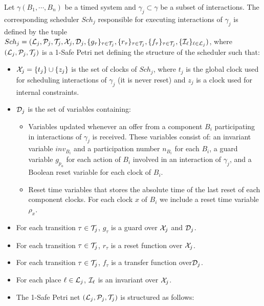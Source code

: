 \begin{definition}[Scheduler]\label{def:sch_sr}
  Let $\gamma(B_1,\cdots,B_n)$ be a timed system and $\gamma_j\subset\gamma$ be a subset of
  interactions. The corresponding scheduler $Sch_j$ responsible for executing interactions
  of $\gamma_j$ is defined by the tuple  
  $Sch_j=(\mathcal{L}_j, \mathcal{P}_j,\mathcal{T}_j,\mathcal{X}_j, \mathcal{D}_j,\{g_{\tau}\}_{\tau\in\mathcal{T}_j},
  \{r_{\tau}\}_{\tau\in\mathcal{T}_j},\{f_{\tau}\}_{\tau\in\mathcal{T}_j},\{\mathcal{I}_{\ell}\}_{\ell\in\mathcal{L}_j})
  $, where $(\mathcal{L}_j,\mathcal{P}_j,\mathcal{T}_j)$ is a 1-Safe Petri net defining 
      the structure of the scheduler such that:
  \begin{itemize}
    \item $\mathcal{X}_j=\{t_j\}\cup\{z_j\}$ is the set of clocks of $Sch_j$, where $t_j$ is
      the global clock used for scheduling interactions of $\gamma_j$ (it is never reset)
      and $z_j$ is a clock used for internal constraints. 
    \item $\mathcal{D}_j$ is the set of variables containing:
      \begin{itemize}
        \item Variables updated whenever an offer from a component $B_i$ participating in 
          interactions of $\gamma_j$ is received. These variables consist of: an invariant
          variable $inv_{B_i}$ and a participation number $n_{B_i}$ for each $B_i$, 
          a guard variable $g_{p_a}$ for each action of $B_i$ involved in an interaction of 
          $\gamma_j$, and a Boolean reset variable for each clock of $B_i$.
        \item Reset time variables that stores the absolute time of the last reset of 
          each component clocks. For each clock $x$ of $B_i$ we include a reset time 
          variable $\rho_x$.
      \end{itemize}
    \item For each transition $\tau\in\mathcal{T}_j$, $g_{\tau}$ is a guard over 
      $\mathcal{X}_j$ and $\mathcal{D}_j$.
    \item For each transition $\tau\in\mathcal{T}_j$, $r_{\tau}$ is a reset function over $\mathcal{X}_j$.
    \item For each transition $\tau\in\mathcal{T}_j$, $f_{\tau}$ is a transfer function over$\mathcal{D}_j$.
    \item For each place $\ell\in\mathcal{L}_j$, $\mathcal{I}_{\ell}$ is an invariant over $\mathcal{X}_j$. 
    \item The 1-Safe Petri net $(\mathcal{L}_j,\mathcal{P}_j,\mathcal{T}_j)$ is structured as follows:
      \begin{itemize}

\end{itemize}
\end{itemize}
\end{definition}
